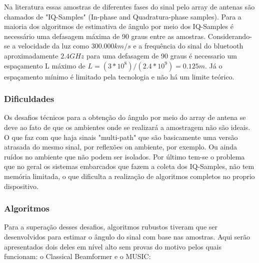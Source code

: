 Na literatura essas amostras de diferentes fases do sinal pelo array de antenas são chamados de "IQ-Samples" (In-phase and Quadratura-phase samples). Para a maioria dos algoritmos de estimativa de ângulo por meio dos IQ-Samples é necessário uma defasagem máxima de 90 graus entre as amostras. Considerando-se a velocidade da luz como \( 300.000 km/s \) e a frequência do sinal do bluetooth aproximadamente \( 2.4 GHz \) para uma defasagem de 90 graus é necessario um espaçamento L máximo de \( L = (3 * 10^8)/(2.4 * 10^9) = 0.125m \). Já o espaçamento mínimo é limitado pela tecnologia e não há um limite teórico.

\subsubsection{Dificuldades}

Os desafios técnicos para a obtenção do ângulo por meio do array de antena se deve ao fato de que os ambientes onde se realizará a amostragem não são ideais. O que faz com que haja sinais "multi-path" que são basicamente uma versão atrasada do mesmo sinal, por reflexões on ambiente, por exemplo. Ou ainda ruídos no ambiente que não podem ser isolados. Por último tem-se o problema que no geral os sistemas embarcados que fazem a coleta dos IQ-Samples, não tem memória limitada, o que dificulta a realização de algoritmos completos no proprio dispositivo.

\subsubsection{Algoritmos}
Para a superação desses desafios, algoritmos rubustos tiveram que ser desenvolvidos para estimar o ângulo do sinal com base nas amostras. Aqui serão apresentados dois deles em nível alto sem provas do motivo pelos quais funcionam: o Classical Beamformer e o MUSIC:

